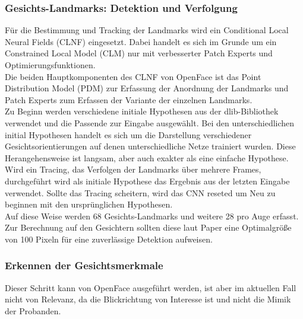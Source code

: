 \subsubsection{Gesichts-Landmarks: Detektion und Verfolgung}
Für die Bestimmung und Tracking der Landmarks wird ein Conditional Local Neural Fields (CLNF) eingesetzt. Dabei handelt es sich im Grunde um ein Constrained Local Model (CLM) nur mit verbesserter Patch Experts und Optimierungsfunktionen.\\
Die beiden Hauptkomponenten des CLNF von OpenFace ist das Point Distribution Model (PDM) zur Erfassung der Anordnung der Landmarks und Patch Experts zum Erfassen der Variante der einzelnen Landmarks.\\
Zu Beginn werden verschiedene initiale Hypothesen aus der dlib-Bibliothek verwendet und die Passende zur Eingabe ausgewählt. Bei den unterschiedlichen initial Hypothesen handelt es sich um die Darstellung verschiedener Gesichtsorientierungen auf denen unterschiedliche Netze trainiert wurden. Diese Herangehensweise ist langsam, aber auch exakter als eine einfache Hypothese. Wird ein Tracing, das Verfolgen der Landmarks über mehrere Frames, durchgeführt wird als initiale Hypothese das Ergebnis aus der letzten Eingabe verwendet. Sollte das Tracing scheitern, wird das CNN reseted um Neu zu beginnen mit den ursprünglichen Hypothesen.\\
Auf diese Weise werden 68 Gesichts-Landmarks und  weitere 28 pro Auge erfasst. Zur Berechnung auf den Gesichtern sollten diese laut Paper \cite{OpenFace} eine Optimalgröße von 100 Pixeln für eine zuverlässige Detektion aufweisen.
\subsubsection{Erkennen der Gesichtsmerkmale}
Dieser Schritt kann von OpenFace ausgeführt werden, ist aber im aktuellen Fall nicht von Relevanz, da die Blickrichtung von Interesse ist und nicht die Mimik der Probanden.
